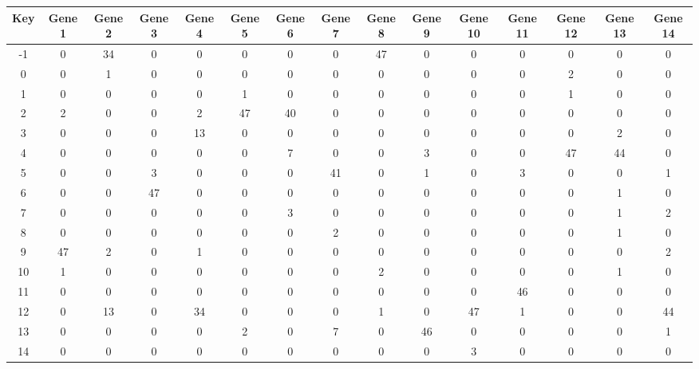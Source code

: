 \begin{tabular}{|c|c|c|c|c|c|c|c|c|c|c|c|c|c|c|}
\hline
Key & Gene 1 & Gene 2 & Gene 3 & Gene 4 & Gene 5 & Gene 6 & Gene 7 & Gene 8 & Gene 9 & Gene 10 & Gene 11 & Gene 12 & Gene 13 & Gene 14 \\
\hline
-1 & 0 & 34 & 0 & 0 & 0 & 0 & 0 & 47 & 0 & 0 & 0 & 0 & 0 & 0 \\
0 & 0 & 1 & 0 & 0 & 0 & 0 & 0 & 0 & 0 & 0 & 0 & 2 & 0 & 0 \\
1 & 0 & 0 & 0 & 0 & 1 & 0 & 0 & 0 & 0 & 0 & 0 & 1 & 0 & 0 \\
2 & 2 & 0 & 0 & 2 & 47 & 40 & 0 & 0 & 0 & 0 & 0 & 0 & 0 & 0 \\
3 & 0 & 0 & 0 & 13 & 0 & 0 & 0 & 0 & 0 & 0 & 0 & 0 & 2 & 0 \\
4 & 0 & 0 & 0 & 0 & 0 & 7 & 0 & 0 & 3 & 0 & 0 & 47 & 44 & 0 \\
5 & 0 & 0 & 3 & 0 & 0 & 0 & 41 & 0 & 1 & 0 & 3 & 0 & 0 & 1 \\
6 & 0 & 0 & 47 & 0 & 0 & 0 & 0 & 0 & 0 & 0 & 0 & 0 & 1 & 0 \\
7 & 0 & 0 & 0 & 0 & 0 & 3 & 0 & 0 & 0 & 0 & 0 & 0 & 1 & 2 \\
8 & 0 & 0 & 0 & 0 & 0 & 0 & 2 & 0 & 0 & 0 & 0 & 0 & 1 & 0 \\
9 & 47 & 2 & 0 & 1 & 0 & 0 & 0 & 0 & 0 & 0 & 0 & 0 & 0 & 2 \\
10 & 1 & 0 & 0 & 0 & 0 & 0 & 0 & 2 & 0 & 0 & 0 & 0 & 1 & 0 \\
11 & 0 & 0 & 0 & 0 & 0 & 0 & 0 & 0 & 0 & 0 & 46 & 0 & 0 & 0 \\
12 & 0 & 13 & 0 & 34 & 0 & 0 & 0 & 1 & 0 & 47 & 1 & 0 & 0 & 44 \\
13 & 0 & 0 & 0 & 0 & 2 & 0 & 7 & 0 & 46 & 0 & 0 & 0 & 0 & 1 \\
14 & 0 & 0 & 0 & 0 & 0 & 0 & 0 & 0 & 0 & 3 & 0 & 0 & 0 & 0 \\
\hline
\end{tabular}